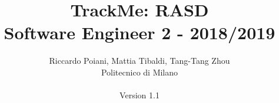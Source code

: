 \documentclass[a4paper]{article}
\begin{document}
\title{TrackMe: RASD \\Software Engineer 2 - 2018/2019}
\author{
        Riccardo Poiani, Mattia Tibaldi, Tang-Tang Zhou \\
        Politecnico di Milano\\\\ 
        Version 1.1
}
\maketitle
\newpage
\tableofcontents
\newpage



\newpage



\newpage



\newpage



\newpage



\newpage
\end{document}
